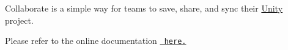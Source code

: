 Collaborate is a simple way for teams to save, share, and sync their \mbox{\hyperlink{namespace_unity}{Unity}} project.

Please refer to the online documentation \href{https://docs.unity3d.com/Manual/UnityCollaborate.html}{\texttt{ here.}} 
